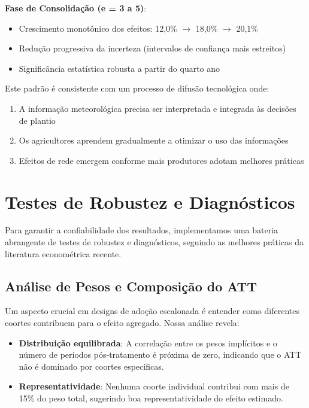 \documentclass[
	12pt,				%
	openright,			%
	oneside,			%
	a4paper,			%
	english,			%
	french,				%
	spanish,			%
	brazil				%
	]{abntex2}
\begin{document}
\textbf{Fase de Consolidação (e = 3 a 5)}:
\begin{itemize}
\item Crescimento monotônico dos efeitos: 12,0\% $\rightarrow$ 18,0\% $\rightarrow$ 20,1\%
\item Redução progressiva da incerteza (intervalos de confiança mais estreitos)
\item Significância estatística robusta a partir do quarto ano
\end{itemize}

Este padrão é consistente com um processo de difusão tecnológica onde:
\begin{enumerate}
\item A informação meteorológica precisa ser interpretada e integrada às decisões de plantio
\item Os agricultores aprendem gradualmente a otimizar o uso das informações
\item Efeitos de rede emergem conforme mais produtores adotam melhores práticas
\end{enumerate}

\section{Testes de Robustez e Diagnósticos}

Para garantir a confiabilidade dos resultados, implementamos uma bateria abrangente de testes de robustez e diagnósticos, seguindo as melhores práticas da literatura econométrica recente.

\subsection{Análise de Pesos e Composição do ATT}

Um aspecto crucial em designs de adoção escalonada é entender como diferentes coortes contribuem para o efeito agregado. Nossa análise revela:

\begin{itemize}
\item \textbf{Distribuição equilibrada}: A correlação entre os pesos implícitos e o número de períodos pós-tratamento é próxima de zero, indicando que o ATT não é dominado por coortes específicas.

\item \textbf{Representatividade}: Nenhuma coorte individual contribui com mais de 15\% do peso total, sugerindo boa representatividade do efeito estimado.
\end{itemize}
\end{document}
